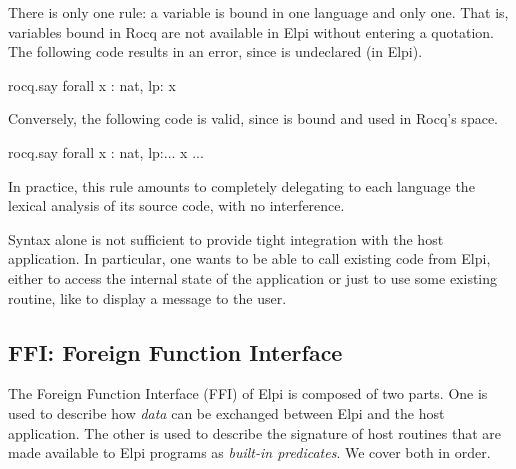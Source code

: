 \documentclass[a4paper, 11pt]{book}
\begin{document}
There is only one rule: a variable is bound in one language and only one. That
is, variables bound in Rocq are not available in Elpi without entering a
quotation. The following code results in an error, since  is undeclared
(in Elpi).

\begin{elpicode}
  rocq.say {{ forall x : nat, lp:{{ x }} }}
\end{elpicode}


\noindent
Conversely, the following code is valid, since  is bound and used in
Rocq's space.

\begin{elpicode}
  rocq.say {{ forall x : nat, lp:{{... {{ x }} ...}} }}
\end{elpicode}


\noindent
In practice, this rule amounts to completely delegating to each language the
lexical analysis of its source code, with no interference.


Syntax alone is not sufficient to provide tight integration with the host
application. In particular, one wants to be able to call existing code from
Elpi, either to access the internal state of the application or just to use
some existing routine, like  to display a message to the user.


\subsection{FFI: Foreign Function Interface}\label{FFI}

The Foreign Function Interface (FFI) of Elpi is composed of two parts. One is
used to describe how \emph{data} can be exchanged between Elpi and the host
application. The other is used to describe the signature of host routines that
are made available to Elpi programs as \emph{built-in predicates}. We cover
both in order.





  
\end{document}
